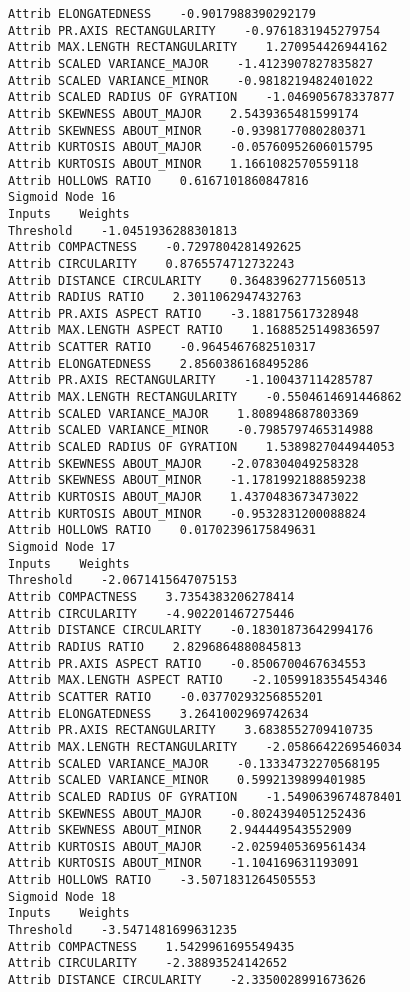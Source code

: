 \documentclass[
	article,			%
	11pt,				%
	oneside,			%
	a4paper,			%
	english,			%
	brazil,				%
	sumario=tradicional
	]{abntex2}
\begin{document}
\begin{lstlisting}
Attrib ELONGATEDNESS    -0.9017988390292179
Attrib PR.AXIS RECTANGULARITY    -0.9761831945279754
Attrib MAX.LENGTH RECTANGULARITY    1.270954426944162
Attrib SCALED VARIANCE_MAJOR    -1.4123907827835827
Attrib SCALED VARIANCE_MINOR    -0.9818219482401022
Attrib SCALED RADIUS OF GYRATION    -1.046905678337877
Attrib SKEWNESS ABOUT_MAJOR    2.5439365481599174
Attrib SKEWNESS ABOUT_MINOR    -0.9398177080280371
Attrib KURTOSIS ABOUT_MAJOR    -0.05760952606015795
Attrib KURTOSIS ABOUT_MINOR    1.1661082570559118
Attrib HOLLOWS RATIO    0.6167101860847816
Sigmoid Node 16
Inputs    Weights
Threshold    -1.0451936288301813
Attrib COMPACTNESS    -0.7297804281492625
Attrib CIRCULARITY    0.8765574712732243
Attrib DISTANCE CIRCULARITY    0.36483962771560513
Attrib RADIUS RATIO    2.3011062947432763
Attrib PR.AXIS ASPECT RATIO    -3.188175617328948
Attrib MAX.LENGTH ASPECT RATIO    1.1688525149836597
Attrib SCATTER RATIO    -0.9645467682510317
Attrib ELONGATEDNESS    2.8560386168495286
Attrib PR.AXIS RECTANGULARITY    -1.100437114285787
Attrib MAX.LENGTH RECTANGULARITY    -0.5504614691446862
Attrib SCALED VARIANCE_MAJOR    1.808948687803369
Attrib SCALED VARIANCE_MINOR    -0.7985797465314988
Attrib SCALED RADIUS OF GYRATION    1.5389827044944053
Attrib SKEWNESS ABOUT_MAJOR    -2.078304049258328
Attrib SKEWNESS ABOUT_MINOR    -1.1781992188859238
Attrib KURTOSIS ABOUT_MAJOR    1.4370483673473022
Attrib KURTOSIS ABOUT_MINOR    -0.9532831200088824
Attrib HOLLOWS RATIO    0.01702396175849631
Sigmoid Node 17
Inputs    Weights
Threshold    -2.0671415647075153
Attrib COMPACTNESS    3.7354383206278414
Attrib CIRCULARITY    -4.902201467275446
Attrib DISTANCE CIRCULARITY    -0.18301873642994176
Attrib RADIUS RATIO    2.8296864880845813
Attrib PR.AXIS ASPECT RATIO    -0.8506700467634553
Attrib MAX.LENGTH ASPECT RATIO    -2.1059918355454346
Attrib SCATTER RATIO    -0.03770293256855201
Attrib ELONGATEDNESS    3.2641002969742634
Attrib PR.AXIS RECTANGULARITY    3.6838552709410735
Attrib MAX.LENGTH RECTANGULARITY    -2.0586642269546034
Attrib SCALED VARIANCE_MAJOR    -0.13334732270568195
Attrib SCALED VARIANCE_MINOR    0.5992139899401985
Attrib SCALED RADIUS OF GYRATION    -1.5490639674878401
Attrib SKEWNESS ABOUT_MAJOR    -0.8024394051252436
Attrib SKEWNESS ABOUT_MINOR    2.944449543552909
Attrib KURTOSIS ABOUT_MAJOR    -2.0259405369561434
Attrib KURTOSIS ABOUT_MINOR    -1.104169631193091
Attrib HOLLOWS RATIO    -3.5071831264505553
Sigmoid Node 18
Inputs    Weights
Threshold    -3.5471481699631235
Attrib COMPACTNESS    1.5429961695549435
Attrib CIRCULARITY    -2.38893524142652
Attrib DISTANCE CIRCULARITY    -2.3350028991673626

\end{lstlisting}
\end{document}
